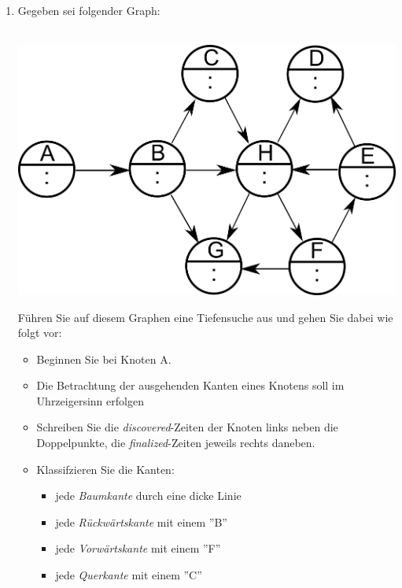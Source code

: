 \documentclass{scrartcl}
\begin{document}
\begin{enumerate}[(1)]
\item Gegeben sei folgender Graph:\\
\ \\
\begin{center}
\includegraphics[width=0.75\linewidth]{images/tiefensuche_aufg}\\
\end{center}
Führen Sie auf diesem Graphen eine Tiefensuche aus und gehen Sie dabei wie folgt vor:
\begin{itemize}
	\item Beginnen Sie bei Knoten A.
	\item Die Betrachtung der ausgehenden Kanten eines Knotens soll im Uhrzeigersinn erfolgen
	\item Schreiben Sie die \textit{discovered}-Zeiten der Knoten links neben die Doppelpunkte, die \textit{finalized}-Zeiten jeweils rechts daneben.
	\item Klassifzieren Sie die Kanten:
	\begin{itemize}
		\item jede \textit{Baumkante} durch eine dicke Linie
		\item jede \textit{Rückwärtskante} mit einem ''B''
		\item jede \textit{Vorwärtskante} mit einem ''F''
		\item jede \textit{Querkante} mit einem ''C''
	\end{itemize} 
\end{itemize}
\end{enumerate}
\end{document}
